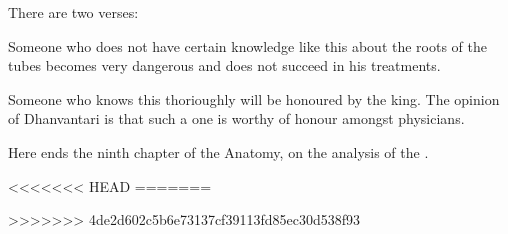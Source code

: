\begin{refsection}
\begin{translation}
\item[13.add1, 13.add2]
There are two verses:

\begin{sloka}
    Someone who does not have certain knowledge like this about the
roots of the tubes becomes very dangerous and does not succeed in
his treatments.
    
Someone who knows this thorioughly will be honoured by the king. 
The opinion of Dhanvantari is that such a one is worthy of  honour
amongst physicians.
\end{sloka}
\bigskip
{\centering
Here ends the ninth chapter of the Anatomy, on the analysis of the
.
\par}

\end{translation}

<<<<<<< HEAD
=======
\printbibliography
\end{refsection}
>>>>>>> 4de2d602c5b6e73137cf39113fd85ec30d538f93
